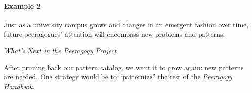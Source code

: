 \begin{refsection}
\paragraph{Example 2} 
Just as a university campus grows and changes in an emergent fashion
over time, future peeragogues' attention will encompass new problems and patterns.


\begin{framed}
\noindent 
\emph{What's Next in the Peeragogy Project}
\begin{collectinmacro}{\ScrapbookWN}{}{}
After pruning back our pattern catalog, we want it to grow again: new patterns are needed.
One strategy would be to ``patternize'' the rest of the \emph{Peeragogy Handbook.}
\end{collectinmacro}
\ScrapbookWN
\end{framed}


\printbibliography[heading=subbibliography]
\end{refsection}
